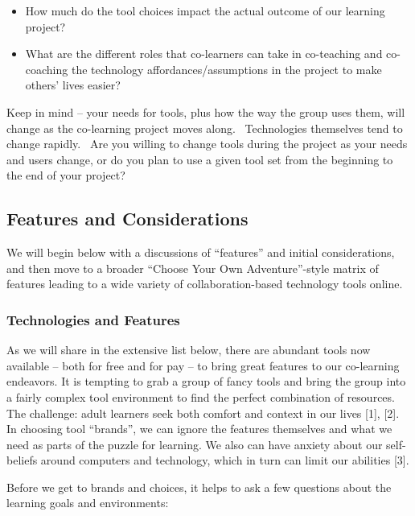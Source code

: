\begin{itemize}
\itemsep1pt\parskip0pt
\item
  How much do the tool choices impact the actual outcome of our learning
  project?
\end{itemize}

\begin{itemize}
\itemsep1pt\parskip0pt
\item
  What are the different roles that co-learners can take in co-teaching
  and co-coaching the technology affordances/assumptions in the project
  to make others' lives easier?
\end{itemize}

Keep in mind -- your needs for tools, plus how the way the group uses
them, will change as the co-learning project moves along.~ Technologies
themselves tend to change rapidly.~ Are you willing to change tools
during the project as your needs and users change, or do you plan to use
a given tool set from the beginning to the end of your project?

\subsection{Features and Considerations}

We will begin below with a discussions of ``features'' and initial
considerations, and then move to a broader ``Choose Your Own
Adventure''-style matrix of features leading to a wide variety of
collaboration-based technology tools online.

\subsubsection{Technologies and Features}

As we will share in the extensive list below, there are abundant tools
now available -- both for free and for pay -- to bring great features to
our co-learning endeavors. It is tempting to grab a group of fancy tools
and bring the group into a fairly complex tool environment to find the
perfect combination of resources. The challenge: adult learners seek
both comfort and context in our lives {[}1{]}, {[}2{]}. In choosing tool
``brands'', we can ignore the features themselves and what we need as
parts of the puzzle for learning. We also can have anxiety about our
self-beliefs around computers and technology, which in turn can limit
our abilities {[}3{]}.

Before we get to brands and choices, it helps to ask a few questions
about the learning goals and environments:

